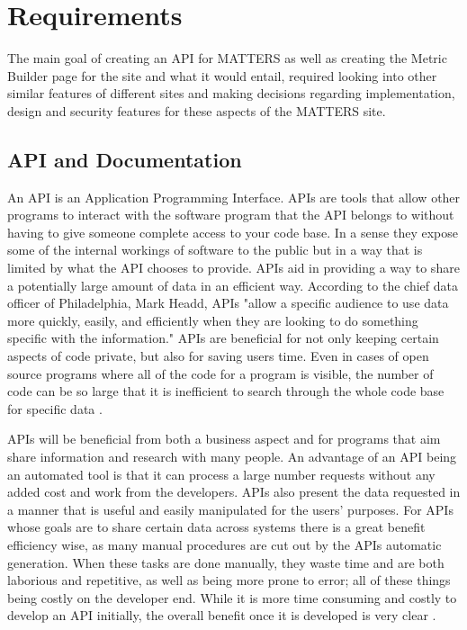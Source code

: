 	\section{Requirements}

		The main goal of creating an API for MATTERS as well as creating the Metric 
		Builder page for the site and what it would entail, required looking into other 
		similar features of different sites and making decisions regarding implementation,
		design and security features for these aspects of the MATTERS site.

	\subsection{API and Documentation}

		An API is an Application Programming Interface. APIs are tools that allow other 
		programs to interact with the software program that the API belongs to without 
		having to give someone complete access to your code base. In a sense they expose 
		some of the internal workings of software to the public but in a way that is 
		limited by what the API chooses to provide. APIs aid in providing a way to share 
		a potentially large amount of data in an efficient way. According to the chief 
		data officer of Philadelphia, Mark Headd, APIs "allow a specific audience to use 
		data more quickly, easily, and efficiently when they are looking to do something 
		specific with the information." APIs are beneficial for not only keeping certain 
		aspects of code private, but also for saving users time. Even in cases of open 
		source programs where all of the code for a program is visible, the number of 
		code can be so large that it is inefficient to search through the whole code base 
		for specific data \cite{govapi}. 

		APIs will be beneficial from both a business aspect and for programs that aim share 
		information and research with many people. An advantage of an API being an automated 
		tool is that it can process a large number requests without any added cost and work 
		from the developers. APIs also present the data requested in a manner that is useful 
		and easily manipulated for the users' purposes. For APIs whose goals are to share 
		certain data across systems there is a great benefit efficiency wise, as many manual 
		procedures are cut out by the APIs automatic generation. When these tasks are done 
		manually, they waste time and are both laborious and repetitive, as well as being more 
		prone to error; all of these things being costly on the developer end. While it is more 
		time consuming and costly to develop an API initially, the overall benefit once it is 
		developed is very clear \cite{govapi}.

